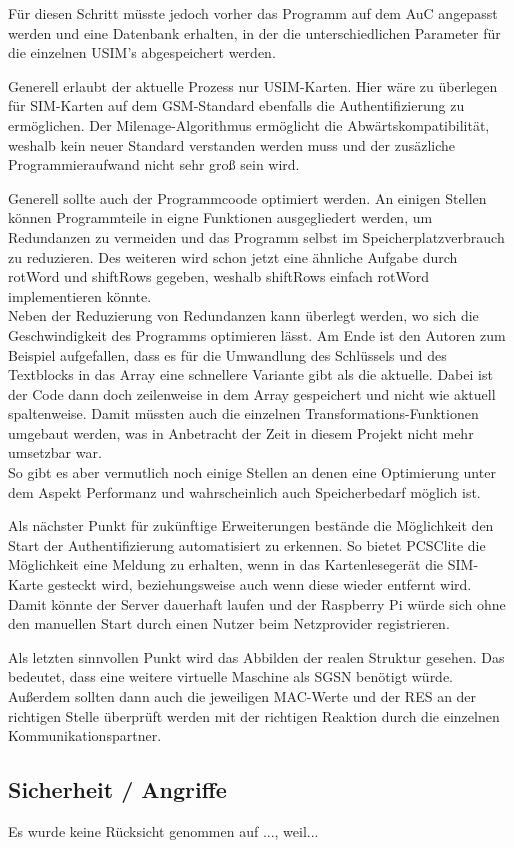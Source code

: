 		Für diesen Schritt müsste jedoch vorher das Programm auf dem AuC angepasst
		werden und eine Datenbank erhalten, in der die unterschiedlichen Parameter für
		die einzelnen USIM's abgespeichert werden.

		Generell erlaubt der aktuelle Prozess nur USIM-Karten. Hier wäre zu überlegen
		für SIM-Karten auf dem GSM-Standard ebenfalls die
		Authentifizierung zu ermöglichen. Der Milenage-Algorithmus ermöglicht die
		Abwärtskompatibilität, weshalb kein neuer Standard verstanden werden muss und
		der zusäzliche Programmieraufwand nicht sehr groß sein wird.
	
		Generell sollte auch der Programmcoode optimiert werden. An einigen Stellen
		können Programmteile in eigne Funktionen ausgegliedert werden, um Redundanzen
		zu vermeiden und das Programm selbst im Speicherplatzverbrauch zu reduzieren. Des
		weiteren wird schon jetzt eine ähnliche Aufgabe durch rotWord und shiftRows
		gegeben, weshalb shiftRows einfach rotWord implementieren könnte. \\
		Neben der Reduzierung von Redundanzen kann überlegt werden, wo sich die
		Geschwindigkeit des Programms optimieren lässt. Am Ende ist den Autoren zum
		Beispiel aufgefallen, dass es für die Umwandlung des Schlüssels und des
		Textblocks in das Array eine schnellere Variante gibt als die aktuelle. Dabei
		ist der Code dann doch zeilenweise in dem Array gespeichert und nicht wie aktuell
		spaltenweise. Damit müssten auch die einzelnen Transformations-Funktionen
		umgebaut werden, was in Anbetracht der Zeit in diesem Projekt nicht mehr umsetzbar
		war. \\
		So gibt es aber vermutlich noch einige Stellen an denen eine Optimierung unter dem
		Aspekt Performanz und wahrscheinlich auch Speicherbedarf möglich ist.
	
		Als nächster Punkt für zukünftige Erweiterungen bestände die Möglichkeit den
		Start der Authentifizierung automatisiert zu erkennen. So bietet PCSClite die
		Möglichkeit eine Meldung zu erhalten, wenn in das Kartenlesegerät die SIM-Karte
		gesteckt wird, beziehungsweise auch wenn diese wieder entfernt wird. Damit
		könnte der Server dauerhaft laufen und der Raspberry Pi würde sich ohne den
		manuellen Start durch einen Nutzer beim Netzprovider registrieren.

		Als letzten sinnvollen Punkt wird das Abbilden der realen Struktur gesehen. Das
		bedeutet, dass eine weitere virtuelle Maschine als SGSN benötigt würde. Außerdem
		sollten dann auch die jeweiligen MAC-Werte und der RES an der richtigen Stelle
		überprüft werden mit der richtigen Reaktion durch die einzelnen Kommunikationspartner.

	\subsection{Sicherheit / Angriffe}
		Es wurde keine Rücksicht genommen auf ..., weil...
